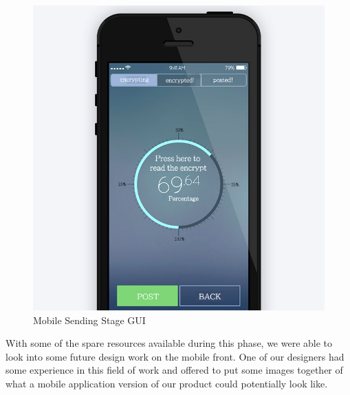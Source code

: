\begin{figure}[H]
    \centering
    \includegraphics[width=\textwidth]{images/design/mobile_send.jpg}
    \caption{Mobile Sending Stage GUI}
    \label{fig:mobile_send}
\end{figure}

With some of the spare resources available during this phase, we were able to 
look into some future design work on the mobile front. One of our designers had
some experience in this field of work and offered to put some images together 
of what a mobile application version of our product could potentially look like. 


